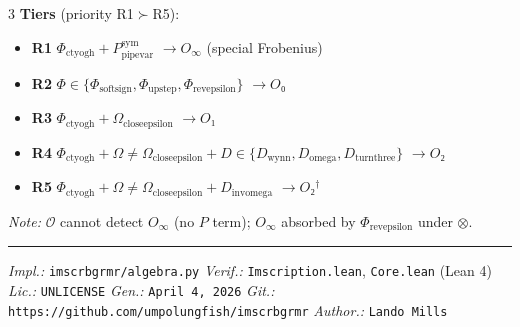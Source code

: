 \documentclass[8pt,a4paper,landscape]{article}
\begin{document}
\begin{multicols}{3}
\textbf{Tiers} (priority R1$\succ$R5):
\begin{itemize}[leftmargin=*,nosep,topsep=2pt,itemsep=1pt]
\item \textbf{R1} $\Phi_{\text{ctyogh}}+P_{\text{pipevar}}^{\text{sym}}$ $\to O_\infty$ (special Frobenius)
\item \textbf{R2} $\Phi\in\{\Phi_{\text{softsign}},\Phi_{\text{upstep}},\Phi_{\text{revepsilon}}\}$ $\to O₀$
\item \textbf{R3} $\Phi_{\text{ctyogh}}+\Omega_{\text{closeepsilon}}$ $\to O₁$
\item \textbf{R4} $\Phi_{\text{ctyogh}}+\Omega{\neq}\Omega_{\text{closeepsilon}}+D\in\{D_{\text{wynn}},D_{\text{omega}},D_{\text{turnthree}}\}$ $\to O₂$
\item \textbf{R5} $\Phi_{\text{ctyogh}}+\Omega{\neq}\Omega_{\text{closeepsilon}}+D_{\text{invomega}}$ $\to O₂^\dagger$
\end{itemize}
\textit{Note:} $\mathcal{O}$ cannot detect $O_\infty$ (no $P$ term); $O_\infty$ absorbed by $\Phi_{\text{revepsilon}}$ under $\otimes$.

\end{multicols}

\vfill
\noindent\hrule
\vspace{0.1em}
\noindent\footnotesize
\textit{Impl.:} \texttt{imscrbgrmr/algebra.py} \quad
\textit{Verif.:} \texttt{Imscription.lean}, \texttt{Core.lean} (Lean 4) \quad
\textit{Lic.:} \texttt{UNLICENSE} \quad
\textit{Gen.:} \texttt{April 4, 2026} \quad
\textit{Git.:} \texttt{https://github.com/umpolungfish/imscrbgrmr} \quad
\textit{Author.:} \texttt{Lando Mills} \quad
\end{document}
